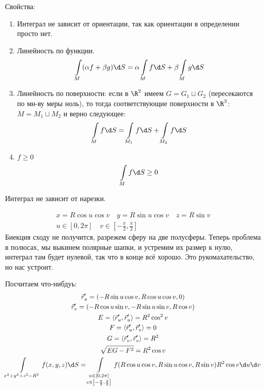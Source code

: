 Свойства:
\begin{enumerate}
\item
	Интеграл не зависит от ориентации, так как ориентации в определении просто нет.

\item
	Линейность по функции.
	\[ \int\limits_M (\alpha f + \beta g) \d S = \alpha \int\limits_M f \d S + \beta \int\limits_M g \d S \]

\item
	Линейность по поверхности: если в $\R^2$ имеем $G = G_1 \sqcup G_2$ (пересекаются по мн-ву меры ноль),
	то тогда соответствующие поверхности в $\R^3$: $M = M_1 \sqcup M_2$ и верно следующее:
	\[ \int\limits_M f \d S = \int\limits_{M_1} f \d S + \int\limits_{M_2} f \d S \]

\item
	$f \ge 0$
	\[ \int\limits_M f \d S \ge 0 \]
\end{enumerate}

\begin{Rem}
	Интеграл не зависит от нарезки.
\end{Rem}

\begin{exmp}
	\begin{gather*}
		x = R \cos u \cos v \quad y = R \sin u \cos v \quad z = R \sin v \\
		u \in [0, 2\pi] \quad v \in \left[-\frac\pi2,\frac\pi2\right]
	\end{gather*}
	Биекция сходу не получится, разрежем сферу на две полусферы.
	Теперь проблема в полюсах, мы выкинем полярные шапки, и устремим их размер к нулю, интеграл там будет нулевой, так что в конце всё хорошо.
	Это рукомахательство, но нас устроит.

	Посчитаем что-нибдуь:
	\begin{gather*}
		\vec r_u' = (-R \sin u \cos v, R \cos u \cos v, 0) \\
		\vec r_v' = (-R \cos u \sin v, -R \sin u \sin v, R \cos v) \\
		E = \left<\vec r_u', \vec r_u'\right> = R^2 \cos^2 v \\
		F = \left<\vec r_u', \vec r_v'\right> = 0 \\
		G = \left<\vec r_v', \vec r_v'\right> = R^2 \\
		\sqrt{EG-F^2} = R^2 \cos v \\
		\int\limits_{x^2+y^2+z^2=R^2} f(x, y, z) \d S
		= \int\limits_{\substack{u \in [0, 2\pi] \\ v \in \left[-\frac\pi2,\frac\pi2\right]}} f(R \cos u \cos v, R \sin u \cos v, R \sin v) R^2 \cos v \d u \d v
	\end{gather*}
\end{exmp}


